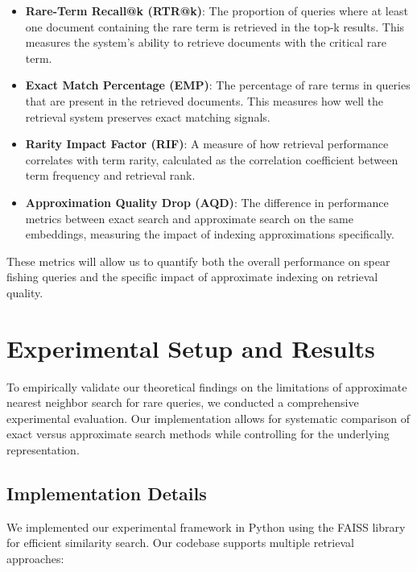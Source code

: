 \documentclass[sigconf,review]{acmart}
\begin{document}
\begin{itemize}
\item \textbf{Rare-Term Recall@k (RTR@k)}: The proportion of queries where at least one document containing the rare term is retrieved in the top-k results. This measures the system's ability to retrieve documents with the critical rare term.

\item \textbf{Exact Match Percentage (EMP)}: The percentage of rare terms in queries that are present in the retrieved documents. This measures how well the retrieval system preserves exact matching signals.

\item \textbf{Rarity Impact Factor (RIF)}: A measure of how retrieval performance correlates with term rarity, calculated as the correlation coefficient between term frequency and retrieval rank.

\item \textbf{Approximation Quality Drop (AQD)}: The difference in performance metrics between exact search and approximate search on the same embeddings, measuring the impact of indexing approximations specifically.
\end{itemize}

These metrics will allow us to quantify both the overall performance on spear fishing queries and the specific impact of approximate indexing on retrieval quality.

\section{Experimental Setup and Results}
To empirically validate our theoretical findings on the limitations of approximate nearest neighbor search for rare queries, we conducted a comprehensive experimental evaluation. Our implementation allows for systematic comparison of exact versus approximate search methods while controlling for the underlying representation.

\subsection{Implementation Details}
We implemented our experimental framework in Python using the FAISS library for efficient similarity search. Our codebase supports multiple retrieval approaches:
\end{document}
